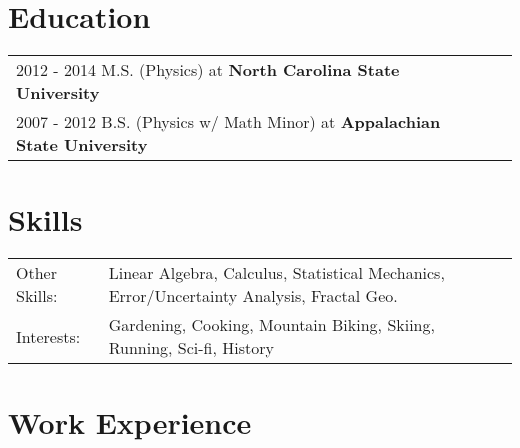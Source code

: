 \documentclass[a4paper,12pt]{article}
\begin{document}
\section{Education}
\begin{tabularx}{\linewidth}{@{}l X@{}}
2012 - 2014 M.S. (Physics) at \textbf{North Carolina State University} \hfill \normalsize \\
2007 - 2012 B.S. (Physics w/ Math Minor) at \textbf{Appalachian State University} \hfill

\end{tabularx}

\section{Skills}
\begin{tabularx}{\linewidth}{@{}l X@{}}
Other Skills: &  \normalsize{Linear Algebra, Calculus, Statistical Mechanics, Error/Uncertainty Analysis, Fractal Geo.}\\
Interests:  &  \normalsize{Gardening, Cooking, Mountain Biking, Skiing, Running, Sci-fi, History}\\
\end{tabularx}




\section{Work Experience}
\end{document}
